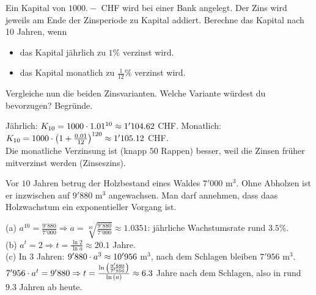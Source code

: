 \documentclass[11pt]{exam}
\begin{document}
\begin{questions}
\question[4] %
Ein Kapital von $1000.-$ CHF wird bei einer Bank angelegt. Der Zins wird jeweils am Ende der Zinsperiode zu Kapital addiert. Berechne das Kapital nach 10 Jahren, wenn
\begin{itemize}
    \item das Kapital jährlich zu $1\%$ verzinst wird.
    \item das Kapital monatlich zu $\frac{1}{12}\%$ verzinst wird.
\end{itemize}
Vergleiche nun die beiden Zinsvarianten. Welche Variante würdest du bevorzugen? Begründe.
{\begin{solution}
		Jährlich: $K_{10}=1000\cdot1.01^{10}\approx1'104.62$ CHF. \quad Monatlich: $K_{10}=1000\cdot\left(1+\frac{0.01}{12}\right)^{120}\approx1'105.12$ CHF.\\
		Die monatliche Verzinsung ist (knapp $50$ Rappen) besser, weil die Zinsen früher mitverzinst werden (Zinseszins).
\end{solution}}
{}

\question[6]
Vor $10$ Jahren betrug der Holzbestand eines Waldes $7'000$ m$^3$. Ohne Abholzen ist er inzwischen auf $9'880$ m$^3$ angewachsen. Man darf annehmen, dass daas Holzwachstum ein exponentieller Vorgang ist.
{\begin{solution}
		(a) $a^{10}=\frac{9'880}{7'000}\Rightarrow a=\sqrt[10]{\frac{9'880}{7'000}}\approx1.0351$: jährliche Wachstumsrate rund $3.5\%$.\\
		(b) $a^t=2\Rightarrow t=\frac{\ln{2}}{\ln{a}}\approx20.1$ Jahre.\\
		(c) In $3$ Jahren: $9'880\cdot a^3\approx10'956$ m$^3$, nach dem Schlagen bleiben $7'956$ m$^3$.\\
		$7'956\*a^t=9'880\Rightarrow t=\frac{\ln{\frac{9'880}{7'956}}}{\ln{a}}\approx6.3$ Jahre nach dem Schlagen, also in rund $9.3$ Jahren ab heute.
\end{solution}}
{}


\end{questions}
\end{document}
